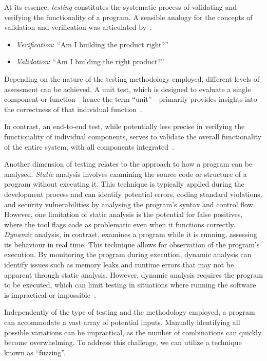 At its essence, \textit{testing} constitutes the systematic process of validating and verifying the functionality of a program. A sensible analogy for the concepts of validation and verification was articulated by~\citet{b_w_boehm_verifying_1984}:

\begin{itemize}[label={}]
    \item \textit{Verification}: “Am I building the product right?” 
    \item \textit{Validation}: “Am I building the right product?”
\end{itemize}



Depending on the nature of the testing methodology employed, different levels of  assessment can be achieved. A unit test, which is designed to evaluate a single component or function—hence the term “unit”—primarily provides insights into the correctness of that individual function~\cite{beck_test-driven_2003}.

In contrast, an end-to-end test, while potentially less precise in verifying the functionality of individual components, serves to validate the overall functionality of the entire system, with all components integrated~\cite{paul_end--end_2001}.

Another dimension of testing relates to the approach to how a program can be analysed.
\textit{Static} analysis involves examining the source code or structure of a program without executing it. This technique is typically applied during the development process and can identify potential errors, coding standard violations, and security vulnerabilities by analysing the program's syntax and control flow. However, one limitation of static analysis is the potential for false positives, where the tool flags code as problematic even when it functions correctly. 
\textit{Dynamic} analysis, in contrast, examines a program while it is running, assessing its behaviour in real time. This technique allows for observation of the program's execution. By monitoring the program during execution, dynamic analysis can identify issues such as memory leaks and runtime errors that may not be apparent through static analysis. However, dynamic analysis requires the program to be executed, which can limit testing in situations where running the software is impractical or impossible~{\cite{hennell_comparison_1990}\cite{umar_comparative_2021}}.

Independently of the type of testing and the methodology employed, a program can accommodate a vast array of potential inputs. Manually identifying all possible variations can be impractical, as the number of combinations can quickly become overwhelming. To address this challenge, we can utilize a technique known as “fuzzing”. 


